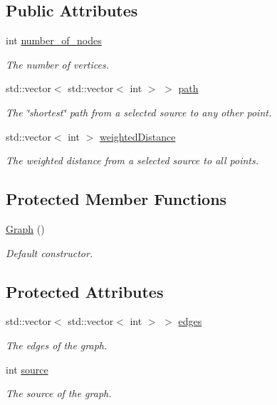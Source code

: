 \subsection*{Public Attributes}
\begin{DoxyCompactItemize}
\item 
int \hyperlink{classMackey_1_1Graph_a6b275a20b0571d4b51fbfa3e596cd67a}{number\+\_\+of\+\_\+nodes}
\begin{DoxyCompactList}\small\item\em The number of vertices. \end{DoxyCompactList}\item 
std\+::vector$<$ std\+::vector$<$ int $>$ $>$ \hyperlink{classMackey_1_1Graph_a66fac95e623ca6e3e85ec33310755831}{path}
\begin{DoxyCompactList}\small\item\em The \char`\"{}shortest\char`\"{} path from a selected source to any other point. \end{DoxyCompactList}\item 
std\+::vector$<$ int $>$ \hyperlink{classMackey_1_1Graph_ab14d4c1bcbe1a994d28a6c590b27ba8b}{weighted\+Distance}
\begin{DoxyCompactList}\small\item\em The weighted distance from a selected source to all points. \end{DoxyCompactList}\end{DoxyCompactItemize}
\subsection*{Protected Member Functions}
\begin{DoxyCompactItemize}
\item 
\hyperlink{classMackey_1_1Graph_a910e6687de1a1a90df5b656e3c850a01}{Graph} ()
\begin{DoxyCompactList}\small\item\em Default constructor. \end{DoxyCompactList}\end{DoxyCompactItemize}
\subsection*{Protected Attributes}
\begin{DoxyCompactItemize}
\item 
std\+::vector$<$ std\+::vector$<$ int $>$ $>$ \hyperlink{classMackey_1_1Graph_a729ec24b9f9e504f4c4e2d3f6e2cab83}{edges}
\begin{DoxyCompactList}\small\item\em The edges of the graph. \end{DoxyCompactList}\item 
int \hyperlink{classMackey_1_1Graph_a43657a07a21a2dcf422876400360ed5b}{source}
\begin{DoxyCompactList}\small\item\em The source of the graph. \end{DoxyCompactList}\end{DoxyCompactItemize}


